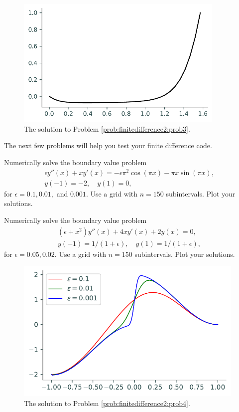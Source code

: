 \begin{figure}[h]
\centering
\includegraphics[width=10cm]{figures/figure3.pdf}
\caption{The solution to Problem \ref{prob:finitedifference2:prob3}.
}
\end{figure}


The next few problems will help you test your finite difference code.

\begin{problem}
Numerically solve the boundary value problem
\begin{align*}
	\epsilon y''(x) + xy'(x) = -\epsilon \pi^2 \cos(\pi x) - \pi x \sin(\pi x), \\
	y(-1) = -2, \quad y(1) = 0,
\end{align*}
for $\epsilon = 0.1, 0.01,$ and $0.001$. Use a grid with $n=150$ subintervals. Plot your solutions.
\label{prob:finitedifference2:prob4}
\end{problem}

\begin{problem}
Numerically solve the boundary value problem
\begin{align*}
	(\epsilon +x^2)y''(x) + 4xy'(x) + 2y(x) = 0, \\
	y(-1) = 1/(1+\epsilon), \quad y(1) = 1/(1+\epsilon),
\end{align*}
for $\epsilon = 0.05, 0.02$. Use a grid with $n=150$ subintervals. Plot your solutions.
\label{prob:finitedifference2:prob5}
\end{problem}

\begin{figure}[h]
\centering
\includegraphics[width=11cm]{figures/figure4.pdf}
\caption{The solution to Problem \ref{prob:finitedifference2:prob4}.
}
\end{figure}

